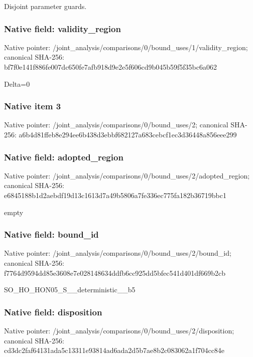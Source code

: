 \documentclass[10pt,a4paper]{article}
\begin{document}
\begingroup\raggedright\sloppy Disjoint parameter guards.\par\endgroup

\subsubsection{Native field: validity\_\allowbreak{}region}
Native pointer: /joint\_\allowbreak{}analysis/comparisons/0/bound\_\allowbreak{}uses/1/validity\_\allowbreak{}region; canonical SHA-256: bf7f0e141f886fe007dc650fe7afb918d9e2e5f606cd9b045b59f5f35bc6a062

\begingroup\raggedright\sloppy Delta=\allowbreak{}0\par\endgroup

\subsubsection{Native item 3}
Native pointer: /joint\_\allowbreak{}analysis/comparisons/0/bound\_\allowbreak{}uses/2; canonical SHA-256: a6b4d81ffeb8e294ee6b438d3ebbf682127a683cebcf1ec3d36448a856eee299

\subsubsection{Native field: adopted\_\allowbreak{}region}
Native pointer: /joint\_\allowbreak{}analysis/comparisons/0/bound\_\allowbreak{}uses/2/adopted\_\allowbreak{}region; canonical SHA-256: e6845188b1d2aebdf19d13c1613d7a49b5806a7fe336ec775fa182b36719bbc1

\begingroup\raggedright\sloppy empty\par\endgroup

\subsubsection{Native field: bound\_\allowbreak{}id}
Native pointer: /joint\_\allowbreak{}analysis/comparisons/0/bound\_\allowbreak{}uses/2/bound\_\allowbreak{}id; canonical SHA-256: f7764d9594dd85e3608e7e028148634ddfb6cc925dd5bfec541d401df669b2cb

\begingroup\raggedright\sloppy SO\_\allowbreak{}HO\_\allowbreak{}HON05\_\allowbreak{}S\_\allowbreak{}\_\allowbreak{}deterministic\_\allowbreak{}\_\allowbreak{}b5\par\endgroup

\subsubsection{Native field: disposition}
Native pointer: /joint\_\allowbreak{}analysis/comparisons/0/bound\_\allowbreak{}uses/2/disposition; canonical SHA-256: cd3dc2faf64131ada5c13311e93814ad6ada2d5b7ae8b2c083062a1f704cc84e
\end{document}
